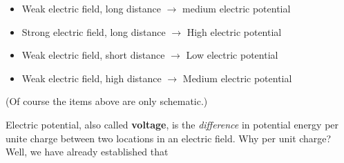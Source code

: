 \documentclass[12pt]{article}
\theoremstyle{definition}
\begin{document}
\begin{itemize}
    \item Weak electric field, long distance $\to $ medium electric potential 
    \item Strong electric field, long distance $\to$ High electric potential 
    \item Weak electric field, short distance $\to $ Low electric potential
    \item Weak electric field, high distance $\to $ Medium electric potential
\end{itemize}

(Of course the items above are only schematic.) 

Electric potential, also called \textbf{voltage}, is the \textit{difference} in
potential energy per unite charge between two locations in an electric field.
Why per unit charge? Well, we have already established that 
\end{document}
